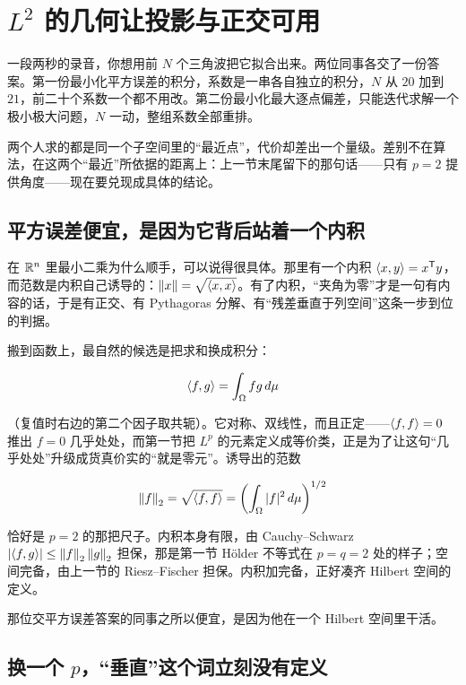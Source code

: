 \section{\texorpdfstring{\(L^2\) 的几何让投影与正交可用}{L2 的几何让投影与正交可用}}
\label{sec:12-Real-Analysis-Support/07-Lp-Spaces-and-Function-Geometry/03}

一段两秒的录音，你想用前 \(N\) 个三角波把它拟合出来。两位同事各交了一份答案。第一份最小化平方误差的积分，系数是一串各自独立的积分，\(N\) 从 \(20\) 加到 \(21\)，前二十个系数一个都不用改。第二份最小化最大逐点偏差，只能迭代求解一个极小极大问题，\(N\) 一动，整组系数全部重排。

两个人求的都是同一个子空间里的``最近点''，代价却差出一个量级。差别不在算法，在这两个``最近''所依据的距离上：上一节末尾留下的那句话——只有 \(p=2\) 提供角度——现在要兑现成具体的结论。

\subsection{平方误差便宜，是因为它背后站着一个内积}

在 \(\mathbb{R}^n\) 里最小二乘为什么顺手，可以说得很具体。那里有一个内积 \(\left\langle x,y\right\rangle=x^{\mathsf{T}}y\)，而范数是内积自己诱导的：\(\left\lVert x\right\rVert=\sqrt{\left\langle x,x\right\rangle}\)。有了内积，``夹角为零''才是一句有内容的话，于是有正交、有 Pythagoras 分解、有``残差垂直于列空间''这条一步到位的判据。

搬到函数上，最自然的候选是把求和换成积分：

\[
\left\langle f,g\right\rangle=\int_\Omega fg\,d\mu
\]

（复值时右边的第二个因子取共轭）。它对称、双线性，而且正定——\(\left\langle f,f\right\rangle=0\) 推出 \(f=0\) 几乎处处，而第一节把 \(L^p\) 的元素定义成等价类，正是为了让这句``几乎处处''升级成货真价实的``就是零元''。诱导出的范数

\[
\left\lVert f\right\rVert_2=\sqrt{\left\langle f,f\right\rangle}=\left(\int_\Omega|f|^2\,d\mu\right)^{1/2}
\]

恰好是 \(p=2\) 的那把尺子。内积本身有限，由 Cauchy--Schwarz \(\left|\left\langle f,g\right\rangle\right|\le\left\lVert f\right\rVert_2\left\lVert g\right\rVert_2\) 担保，那是第一节 Hölder 不等式在 \(p=q=2\) 处的样子；空间完备，由上一节的 Riesz--Fischer 担保。内积加完备，正好凑齐 Hilbert 空间的定义。

那位交平方误差答案的同事之所以便宜，是因为他在一个 Hilbert 空间里干活。

\subsection{\texorpdfstring{换一个 \(p\)，``垂直''这个词立刻没有定义}{换一个 p，垂直这个词立刻没有定义}}

